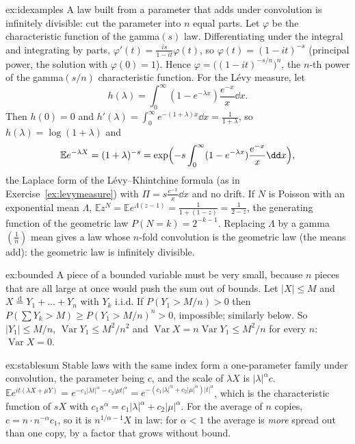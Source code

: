 \begin{solution}{ex:idexamples}
\idea A law built from a parameter that adds under convolution is infinitely divisible: cut the parameter into $n$ equal parts.
\writeup Let $\varphi$ be the characteristic function of the gamma$(s)$ law. Differentiating under the integral and integrating by parts,
$\varphi'(t)=\frac{is}{1-it}\varphi(t)$, so $\varphi(t)=(1-it)^{-s}$ (principal power, the solution with $\varphi(0)=1$). Hence $\varphi=\bigl((1-it)^{-s/n}\bigr)^n$, the $n$-th power
of the gamma$(s/n)$ characteristic function. For the L\'evy measure, let
\[
h(\lambda)=\int_0^\infty(1-e^{-\lambda x})\frac{e^{-x}}x\dd x.
\]
Then $h(0)=0$ and $h'(\lambda)=\int_0^\infty e^{-(1+\lambda)x}\dd x=\frac1{1+\lambda}$, so $h(\lambda)=\log(1+\lambda)$ and
\[
\mathbb Ee^{-\lambda X}=(1+\lambda)^{-s}=\exp\Bigl(-s\int_0^\infty(1-e^{-\lambda x})\frac{e^{-x}}x\dd x\Bigr),
\]
the Laplace form of the L\'evy--Khintchine formula (as in Exercise~\ref{ex:levymeasure}) with $\Pi=s\frac{e^{-x}}x\dd x$ and no drift. If $N$ is Poisson with an exponential mean $\Lambda$,
$\mathbb Ez^N=\mathbb Ee^{\Lambda(z-1)}=\frac1{1+(1-z)}=\frac1{2-z}$, the generating function of the geometric law $P(N=k)=2^{-k-1}$. Replacing $\Lambda$ by a gamma$(\frac1n)$
mean gives a law whose $n$-fold convolution is the geometric law (the means add): the geometric law is infinitely divisible.
\end{solution}

\begin{solution}{ex:bounded}
\idea A piece of a bounded variable must be very small, because $n$ pieces that are all large at once would push the sum out of bounds.
\writeup Let $|X|\le M$ and $X\overset{\mathrm d}=Y_1+\dots+Y_n$ with $Y_k$ i.i.d. If $P(Y_1>M/n)>0$ then $P(\sum Y_k>M)\ge P(Y_1>M/n)^n>0$, impossible; similarly below.
So $|Y_1|\le M/n$, $\operatorname{Var}Y_1\le M^2/n^2$ and $\operatorname{Var}X=n\operatorname{Var}Y_1\le M^2/n$ for every $n$: $\operatorname{Var}X=0$.
\end{solution}

\begin{solution}{ex:stablesum}
\idea Stable laws with the same index form a one-parameter family under convolution, the parameter being $c$, and the scale of $\lambda X$ is $|\lambda|^\alpha c$.
\writeup $\mathbb Ee^{it(\lambda X+\mu Y)}=e^{-c_1|\lambda t|^\alpha-c_2|\mu t|^\alpha}=e^{-(c_1|\lambda|^\alpha+c_2|\mu|^\alpha)|t|^\alpha}$, which is the characteristic function of $sX$ with
$c_1s^\alpha=c_1|\lambda|^\alpha+c_2|\mu|^\alpha$. For the average of $n$ copies, $c=n\cdot n^{-\alpha}c_1$, so it is $n^{1/\alpha-1}X$ in law: for $\alpha<1$ the average is
\emph{more} spread out than one copy, by a factor that grows without bound.
\end{solution}

